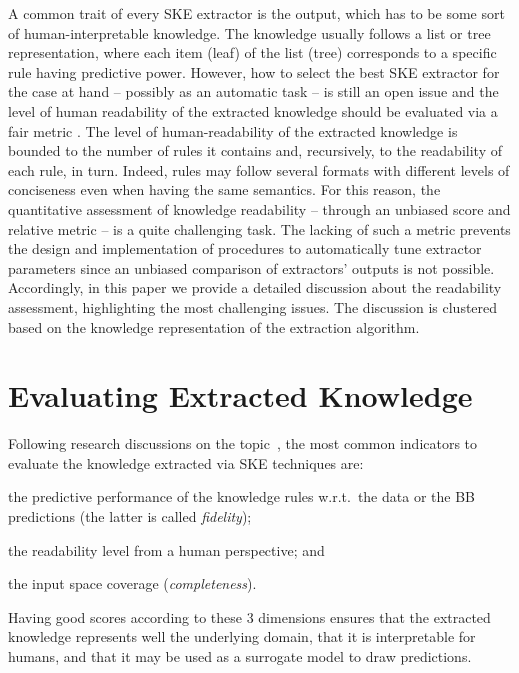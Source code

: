 \documentclass[sigconf]{acmart}
\begin{document}
A common trait of every SKE extractor is the output, which has to be some sort of human-interpretable knowledge.
%
The knowledge usually follows a list or tree representation, where each item (leaf) of the list (tree) corresponds to a specific rule having predictive power.
%
However, how to select the best SKE extractor for the case at hand -- possibly as an automatic task -- is still an open issue and the level of human readability of the extracted knowledge should be evaluated via a fair metric \cite{Sovrano2022,Mulder2021}.
%
The level of human-readability of the extracted knowledge is bounded to the number of rules it contains and, recursively, to the readability of each rule, in turn.
%
Indeed, rules may follow several formats with different levels of conciseness even when having the same semantics.
%
For this reason, the quantitative assessment of knowledge readability -- through an unbiased score and relative metric -- is a quite challenging task.
%
The lacking of such a metric prevents the design and implementation of procedures to automatically tune extractor parameters since an unbiased comparison of extractors' outputs is not possible.
%
Accordingly, in this paper we provide a detailed discussion about the readability assessment, highlighting the most challenging issues. The discussion is clustered based on the knowledge representation of the extraction algorithm.

\section{Evaluating Extracted Knowledge}

Following research discussions on the topic~\cite{garcez2001symbolic,tran2013knowledge}, the most common indicators to evaluate the knowledge extracted via SKE techniques are:
%
\begin{inlinelist}
	\item the predictive performance of the knowledge rules w.r.t.\ the data or the BB predictions (the latter is called \emph{fidelity});
	\item the readability level from a human perspective; and
	\item the input space coverage (\emph{completeness}).
\end{inlinelist}
%
Having good scores according to these 3 dimensions ensures that the extracted knowledge represents well the underlying domain, that it is interpretable for humans, and that it may be used as a surrogate model to draw predictions. 
\end{document}
